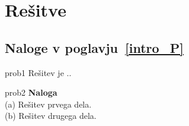 
\chapter*{Rešitve}

\section*{Naloge v poglavju~\ref{intro_P}}

\begin{sol}{prob1}
Rešitev je ..
\end{sol}


\begin{sol}{prob2}
\textbf{Naloga }\\
(a) Rešitev prvega dela.\\
(b) Rešitev drugega dela.
\end{sol}

